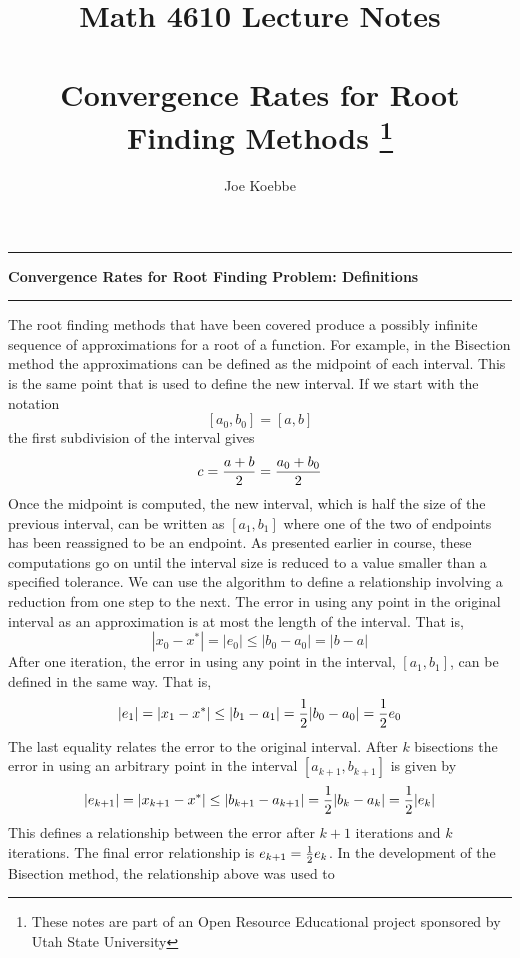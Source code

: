 \documentclass[10pt,fleqn]{article}
\title{Math 4610 Lecture Notes \\
            \ \\
      Convergence Rates for Root Finding Methods
  \footnote{These notes are part of an Open Resource Educational project
            sponsored by Utah State University}}
\author{Joe Koebbe}
\begin{document}
\maketitle
\newpage
\vskip0.1in\hrule\vskip0.1in
\noindent
{\bf Convergence Rates for Root Finding Problem: Definitions} 
\vskip0.1in\hrule\vskip0.1in
\noindent
The root finding methods that have been covered produce a possibly infinite
sequence of approximations for a root of a function. For example, in the
Bisection method the approximations can be defined as the midpoint of each
interval. This is the same point that is used to define the new interval. If
we start with the notation
$$
  [ a_0, b_0 ] = [a, b]
$$
the first subdivision of the interval gives
$$
  c = {{a + b}\over 2} = {{a_0 + b_0}\over 2}
$$
Once the midpoint is computed, the new interval, which is half the size of the
previous interval, can be written as $[a_1,b_1]$ where one of the two of
endpoints has been reassigned to be an endpoint. As presented earlier in
course, these computations go on until the interval size is reduced to a value
smaller than a specified tolerance.
We can use the algorithm to define a relationship involving a reduction from one
step to the next. The error in using any point in the original interval as an
approximation is at most the length of the interval. That is,
$$
  | x_0 - x^* | = | e_0 | \leq | b_0 - a_0 | = | b - a |
$$
After one iteration, the error in using any point in the interval, $[a_1, b_1]$,
can be defined in the same way. That is,
$$
  | e_1 | = | x_1 - x^* | \leq | b_1 - a_1 | = {1\over 2} | b_0 - a_0 |
                                       = {1\over 2} e_0
$$
The last equality relates the error to the original interval. After $k$
bisections the error in using an arbitrary point in the interval
$[a_{k+1}, b_{k+1}]$ is given by
$$
  | e_{k+1} | = | x_{k+1} - x^* | \leq | b_{k+1} - a_{k+1} |
                          = {1\over 2} | b_k - a_k | = {1\over 2} | e_k |
$$
This defines a relationship between the error after $k+1$ iterations and $k$
iterations. The final error relationship is $e_{k+1}={1\over 2} e_k$.
In the development of the Bisection method, the relationship above was used to
\end{document}
